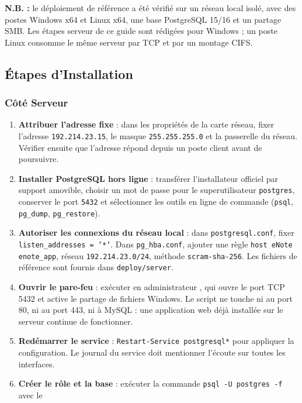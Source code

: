 \textbf{N.B. :} le déploiement de référence a été vérifié sur un réseau local isolé, avec des postes
Windows x64 et Linux x64, une base PostgreSQL 15/16 et un partage SMB. Les étapes serveur de ce guide
sont rédigées pour Windows ; un poste Linux consomme le même serveur par \ac{TCP} et par un montage
CIFS.

\subsection{Étapes d'Installation}
\subsubsection{Côté Serveur}
\begin{enumerate}
    \item \textbf{Attribuer l'adresse fixe} : dans les propriétés de la carte réseau, fixer l'adresse
          \texttt{192.214.23.15}, le masque \texttt{255.255.255.0} et la passerelle du réseau. Vérifier
          ensuite que l'adresse répond depuis un poste client avant de poursuivre.
    \item \textbf{Installer PostgreSQL hors ligne} : transférer l'installateur officiel par support
          amovible, choisir un mot de passe pour le superutilisateur \texttt{postgres}, conserver le
          port \texttt{5432} et sélectionner les outils en ligne de commande (\texttt{psql},
          \texttt{pg\_dump}, \texttt{pg\_restore}).
    \item \textbf{Autoriser les connexions du réseau local} : dans \texttt{postgresql.conf}, fixer
          \texttt{listen\_addresses = '*'}. Dans \texttt{pg\_hba.conf}, ajouter une règle
          \texttt{host eNote enote\_app}, réseau \texttt{192.214.23.0/24}, méthode
          \texttt{scram-sha-256}. Les fichiers de référence sont fournis dans
          \texttt{deploy/server}.
    \item \textbf{Ouvrir le pare-feu} : exécuter en administrateur
          , qui ouvre le port \ac{TCP} 5432 et active le partage
          de fichiers Windows. Le script ne touche ni au port 80, ni au port 443, ni à MySQL : une
          application web déjà installée sur le serveur continue de fonctionner.
    \item \textbf{Redémarrer le service} : \texttt{Restart-Service postgresql*} pour appliquer la
          configuration. Le journal du service doit mentionner l'écoute sur toutes les interfaces.
    \item \textbf{Créer le rôle et la base} : exécuter la commande \texttt{psql -U postgres -f} avec le

\end{enumerate}

